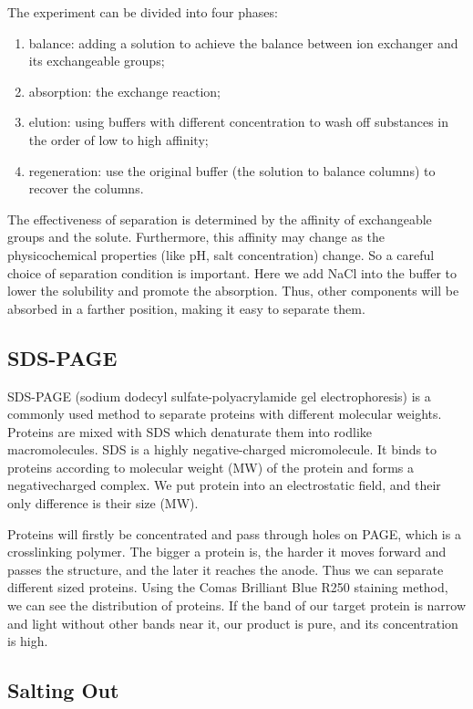 The experiment can be divided into four phases:
\begin{enumerate}
\item balance: adding a solution to achieve the balance between ion exchanger and its exchangeable groups;
\item absorption: the exchange reaction;
\item elution: using buffers with different concentration to wash off substances in the order of low to high  affinity;
\item regeneration: use the original buffer (the solution to balance columns) to recover the columns.
\end{enumerate}

The effectiveness of separation is determined by the affinity of exchangeable groups and the solute. Furthermore, this affinity may change as the physicochemical properties (like pH,
salt concentration) change. So a careful choice of separation condition is important. Here
we add NaCl into the buffer to lower the solubility and promote the absorption. Thus, other
components will be absorbed in a farther position, making it easy to separate them.


\subsection{SDS-PAGE}

SDS-­PAGE (sodium dodecyl sulfate-polyacrylamide gel electrophoresis) is a commonly
used method to separate proteins with different molecular weights. Proteins are mixed with
SDS which denaturate them into rodlike macromolecules. SDS is a highly negative-­charged
micromolecule. It binds to proteins according to molecular weight (MW) of the protein and
forms a negative­charged complex. We put protein into an electrostatic field, and their only
difference is their size (MW).

Proteins will firstly be concentrated and pass through holes on PAGE, which is a crosslink­ing polymer. The bigger a protein is, the harder it moves forward and passes the structure, and
the later it reaches the anode. Thus we can separate different sized proteins. Using the Comas
Brilliant Blue R250 staining method, we can see the distribution of proteins. If the band of
our target protein is narrow and light without other bands near it, our product is pure, and its
concentration is high.

\subsection{Salting Out}


